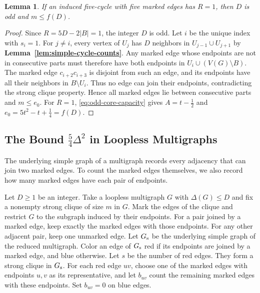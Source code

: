 \documentclass[preprint,11pt,numbers]{elsarticle-arxiv}
\numberwithin{equation}{section}
\newtheorem{lemma}[theorem]{Lemma}
\theoremstyle{definition}
\begin{document}
\begin{lemma}\label{lem:odd-unit-slack}
If an induced five-cycle with five marked edges has $R=1$, then $D$ is odd and $m\leq f(D)$.
\end{lemma}

\begin{proof}
Since $R=5D-2|B|=1$, the integer $D$ is odd. Let $i$ be the
unique index with $s_i=1$. For $j\ne i$, every vertex of $U_j$
has $D$ neighbors in $U_{j-1}\cup U_{j+1}$ by
\textbf{Lemma~\ref{lem:simple-cycle-counts}}. Any marked edge
whose endpoints are not in consecutive parts must therefore
have both endpoints in $U_i\cup(V(G)\setminus B)$. The marked
edge $c_{i+2}c_{i+3}$ is disjoint from such an edge, and its
endpoints have all their neighbors in $B\setminus U_i$. Thus no
edge can join their endpoints, contradicting the strong clique
property. Hence all marked edges lie between consecutive parts
and $m\leq e_0$.
For $R=1$, \eqref{eq:odd-core-capacity} gives
$A=t-\frac{1}{2}$ and $e_0=5t^2-t+\frac{1}{4}=f(D)$.
\end{proof}
\relax\space%

\subsection{The Bound \texorpdfstring{$\frac{5}{4}\Delta^2$}{5 Delta squared / 4} in Loopless Multigraphs}
\label{sec:multigraph}\label{sec:weighted-counts}

The underlying simple graph of a multigraph records every adjacency
that can join two marked edges. To count the marked edges themselves,
we also record how many marked edges have each pair of endpoints.

Let $D\geq1$ be an integer. Take a loopless multigraph $G$ with
$\Delta(G)\leq D$ and fix a
nonempty strong clique of size $m$ in $G$. Mark the edges of the clique
and restrict $G$ to the subgraph induced by their endpoints.
For a pair joined by a marked edge, keep exactly the marked edges
with those endpoints. For any other adjacent pair, keep one
unmarked edge. Let $G_{\rm s}$ be the underlying simple graph of
the reduced multigraph. Color an edge of $G_{\rm s}$ red if its
endpoints are joined by a marked edge, and blue otherwise.
Let $s$ be the number of red edges. They form a strong clique in
$G_{\rm s}$. For each red
edge $uv$, choose one of the marked edges with endpoints $u,v$ as
its representative, and let $b_{uv}$ count the remaining marked
edges with these endpoints. Set $b_{uv}=0$ on blue edges.
\end{document}
